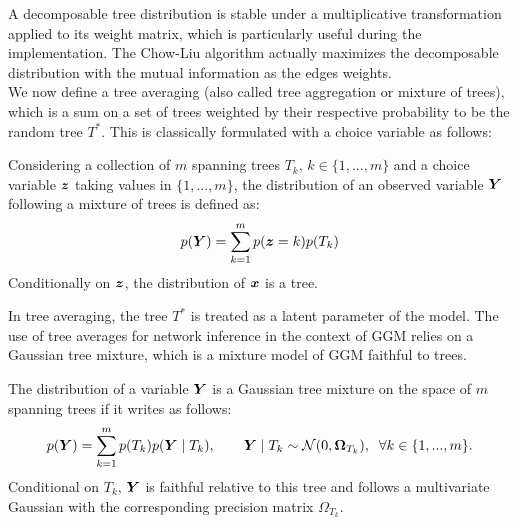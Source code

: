 A decomposable tree distribution is stable under a multiplicative transformation applied to its weight matrix, which is particularly useful during the implementation. The Chow-Liu algorithm actually maximizes the decomposable distribution with the mutual information as the edges weights.\\


We now define a tree averaging (also called tree aggregation or mixture of trees), which is a sum on a set of trees weighted by their respective probability to be the random tree $T^*$. This is classically  formulated with a choice variable as follows:
 
 \begin{definition}
 Considering a collection of $m$ spanning trees $T_k$, $k\in\{1,...,m\}$ and a choice variable ${\boldsymbol{z}}$ taking values in $\{1,...,m\}$, the distribution of an observed variable ${\boldsymbol{Y}}$ following a  mixture of trees  is defined as:
$$ p({\boldsymbol{Y}}) = \sum_{k=1}^m p({\boldsymbol{z}}=k) p(T_k)$$
Conditionally on ${\boldsymbol{z}}$, the distribution of ${\boldsymbol{x}}$ is a tree.
 \end{definition}

In tree averaging, the tree $T^*$ is treated as a latent parameter of the model. The use of tree averages for network inference in the context of GGM relies on a Gaussian tree mixture, which is a mixture model of GGM faithful to trees.
\begin{definition}\label{treemixt}
The distribution of a variable ${\boldsymbol{Y}}$ is a Gaussian tree mixture on the space of $m$ spanning trees if it writes as follows:
$$p({\boldsymbol{Y}}) = \sum_{k=1}^m  p(T_k) p({\boldsymbol{Y}}\mid T_k),\qquad  {\boldsymbol{Y}}\mid T_k\sim\mathcal{N} (0, {\boldsymbol{\Omega}}_{T_k}), \;\; \forall k\in\{1,...,m\}.$$
Conditional on $T_k$, ${\boldsymbol{Y}}$ is faithful relative to this tree and follows a multivariate Gaussian with the corresponding precision matrix $\Omega_{T_k}$.
\end{definition}
 
